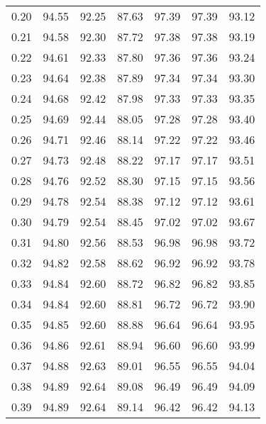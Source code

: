 \begin{tabular}{|c|c|c|c|c|c|c|}
      0.20 &     94.55 &     92.25 &      87.63 &   97.39 &      97.39 &         93.12 \\
      0.21 &     94.58 &     92.30 &      87.72 &   97.38 &      97.38 &         93.19 \\
      0.22 &     94.61 &     92.33 &      87.80 &   97.36 &      97.36 &         93.24 \\
      0.23 &     94.64 &     92.38 &      87.89 &   97.34 &      97.34 &         93.30 \\
      0.24 &     94.68 &     92.42 &      87.98 &   97.33 &      97.33 &         93.35 \\
      0.25 &     94.69 &     92.44 &      88.05 &   97.28 &      97.28 &         93.40 \\
      0.26 &     94.71 &     92.46 &      88.14 &   97.22 &      97.22 &         93.46 \\
      0.27 &     94.73 &     92.48 &      88.22 &   97.17 &      97.17 &         93.51 \\
      0.28 &     94.76 &     92.52 &      88.30 &   97.15 &      97.15 &         93.56 \\
      0.29 &     94.78 &     92.54 &      88.38 &   97.12 &      97.12 &         93.61 \\
      0.30 &     94.79 &     92.54 &      88.45 &   97.02 &      97.02 &         93.67 \\
      0.31 &     94.80 &     92.56 &      88.53 &   96.98 &      96.98 &         93.72 \\
      0.32 &     94.82 &     92.58 &      88.62 &   96.92 &      96.92 &         93.78 \\
      0.33 &     94.84 &     92.60 &      88.72 &   96.82 &      96.82 &         93.85 \\
      0.34 &     94.84 &     92.60 &      88.81 &   96.72 &      96.72 &         93.90 \\
      0.35 &     94.85 &     92.60 &      88.88 &   96.64 &      96.64 &         93.95 \\
      0.36 &     94.86 &     92.61 &      88.94 &   96.60 &      96.60 &         93.99 \\
      0.37 &     94.88 &     92.63 &      89.01 &   96.55 &      96.55 &         94.04 \\
      0.38 &     94.89 &     92.64 &      89.08 &   96.49 &      96.49 &         94.09 \\
      0.39 &     94.89 &     92.64 &      89.14 &   96.42 &      96.42 &         94.13 \\

\end{tabular}
